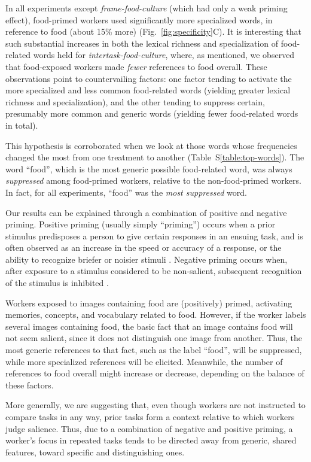 \documentclass{pnastwo}
\begin{document}
\begin{article}
In all experiments except \textit{frame-food-culture} (which had only a weak
priming effect), food-primed workers used significantly more
specialized words, in reference to food (about 15\% more)
(Fig.~\ref{fig:specificity}C).  It is interesting that such substantial
increases in both the lexical richness and specialization of food-related words
held for \textit{intertask-food-culture}, where, as mentioned, we observed that
food-exposed workers made \textit{fewer} references to food overall.  These
observations point to countervailing factors: one factor tending to activate
the more specialized and less common food-related words (yielding greater
lexical richness and specialization), and the other tending to suppress
certain, presumably more common and generic words (yielding fewer food-related
words in total).

This hypothesis is corroborated when we look at those words whose frequencies
changed the most from one treatment to another (Table~S\ref{table:top-words}).
The word ``food'', which is the most generic possible food-related word, was
always \textit{suppressed} among food-primed workers, relative to the
non-food-primed workers.  In fact, for all experiments, ``food'' was the
\textit{most suppressed} word.

Our results can be explained through a combination of positive and negative
priming.  Positive priming (usually simply ``priming'') occurs when a prior
stimulus predisposes a person to give certain responses in an ensuing task, and
is often observed as an increase in the speed or accuracy of a response, or the
ability to recognize briefer or noisier stimuli
\cite{BJOP1796,BJOP1826,Huber2008324}.  Negative priming occurs when, after
exposure to a stimulus considered to be non-salient, subsequent recognition of
the stimulus is inhibited \cite{mayr2007negative}.

Workers exposed to images containing food are (positively) primed, activating
memories, concepts, and vocabulary related to food.  However, if the worker
labels several images containing food, the basic fact that an image contains
food will not seem salient, since it does not distinguish one image from
another.  Thus, the most generic references to that fact, such as the label
``food'', will be suppressed, while more specialized references will be
elicited.  Meanwhile, the number of references to food overall might increase
or decrease, depending on the balance of these factors.  

More generally, we are suggesting that, even though workers are not instructed
to compare tasks in any way, prior tasks form a context relative to which
workers judge salience.  Thus, due to a combination of negative and positive
priming, a worker's focus in repeated tasks tends to be directed away from
generic, shared features, toward specific and distinguishing ones.


\end{article}
\end{document}
